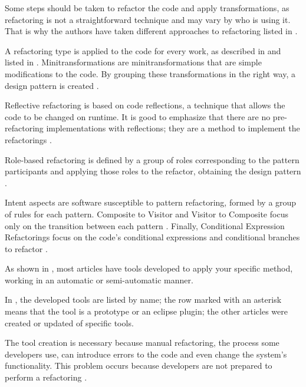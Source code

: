 Some steps should be taken to refactor the code and apply transformations, as refactoring is not a straightforward technique and may vary by who is using it. That is why the authors have taken different approaches to refactoring listed in .



A refactoring type is applied to the code for every work, as described in  and listed in . Minitransformations are minitransformations that are simple modifications to the code. By grouping these transformations in the right way, a design pattern is created \cite{cinneide2001automated}.

Reflective refactoring is based on code reflections, a technique that allows the code to be changed on runtime. It is good to emphasize that there are no pre-refactoring implementations with reflections; they are a method to implement the refactorings \cite{beluzzo2018abordagem}. 

Role-based refactoring is defined by a group of roles corresponding to the pattern participants and applying those roles to the refactor, obtaining the design pattern \cite{mens972774}. 

Intent aspects are software susceptible to pattern refactoring, formed by a group of rules for each pattern\cite{ram2004detecting}. Composite to Visitor and Visitor to Composite focus only on the transition between each pattern \cite{beluzzo2018abordagem}. Finally, Conditional Expression Refactorings focus on the code's conditional expressions and conditional branches to refactor \cite{CHRISTOPOULOU20121201}.

As shown in , most articles have tools developed to apply your specific method, working in an automatic or semi-automatic manner.



In , the developed tools are listed by name; the row marked with an asterisk means that the tool is a prototype or an eclipse plugin; the other articles were created or updated of specific tools\cite{beluzzo2018abordagem}.

The tool creation is necessary because manual refactoring, the process some developers use, can introduce errors to the code and even change the system's functionality. This problem occurs because developers are not prepared to perform a refactoring \cite{ge2012reconciling}.

